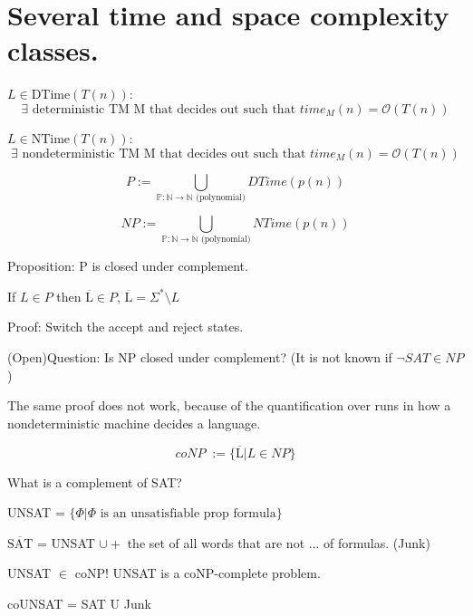 \documentclass[a4paper,12pt]{article}
\theoremstyle{definition}
\theoremstyle{remark}
\newcommand{\N}{\mathbb{N}}
\newcommand{\Pp}{\mathbb{P}}
\begin{document}
\newpage
\section{Several time and space complexity classes.}

$L \in \text{DTime}(T(n))$:
\begin{equation*}
    \exists \text{ deterministic TM M that decides out such that } time_M(n) = \mathscr{O}(T(n))
\end{equation*}

$L \in \text{NTime}(T(n))$: 
\begin{equation*}
    \exists \text{ nondeterministic TM M that decides out such that } time_M(n) = \mathscr{O}(T(n))
\end{equation*}

\begin{equation*}
    P := \bigcup\limits_{\Pp: \N \to \N \text{ (polynomial)}} DTime(p(n))
\end{equation*}


\begin{equation*}
    NP := \bigcup\limits_{\Pp: \N \to \N \text{ (polynomial)}} NTime(p(n))
\end{equation*}

Proposition: P is closed under complement.

If $L \in P$ then $\overline{\text{L}} \in P$, $\overline{\text{L}} = \Sigma^* \setminus L$

Proof: Switch the accept and reject states.

(Open)Question: Is NP closed under complement? (It is not known if $\neg SAT \in NP$)

The same proof does not work, because of the quantification over runs in how a nondeterministic machine decides a language.

\begin{equation*}
    coNP \; := \{ \overline{\text{L}} | L \in NP\}
\end{equation*}

What is a complement of SAT?

UNSAT = $\{\Phi | \Phi \text{ is an unsatisfiable prop formula}\}$

$\overline{\text{SAT}}$ = UNSAT $\cup +$ the set of all words that are not ... of formulas. (Junk) %

UNSAT $\in$ coNP! UNSAT is a coNP-complete problem.

coUNSAT = SAT U Junk
\end{document}

